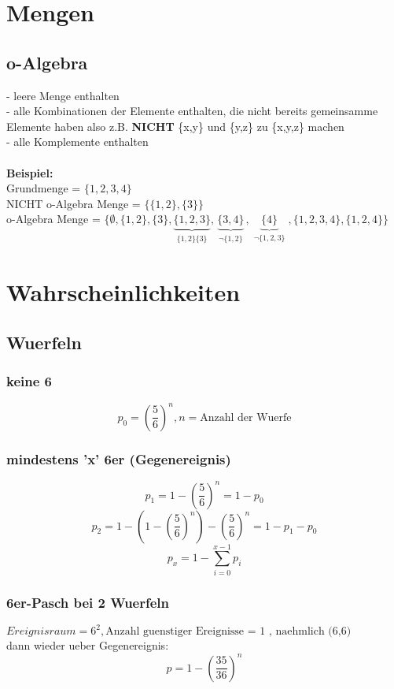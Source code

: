 \documentclass{article}
\begin{document}
\section{Mengen}
\subsection{o-Algebra}
- leere Menge enthalten\\
- alle Kombinationen der Elemente enthalten, die nicht bereits gemeinsamme Elemente haben also z.B. \textbf{NICHT} \{x,y\} und \{y,z\} zu \{x,y,z\} machen\\
- alle Komplemente enthalten\\ \\
\textbf{Beispiel:}\\
Grundmenge = $\{1,2,3,4\}$\\
NICHT o-Algebra Menge = $\{\{1,2\},\{3\}\}$\\
o-Algebra Menge = $\{\emptyset ,\{1,2\},\{3\},
	\underbrace{\{1,2,3\}}_{\substack{\{1,2\}\{3\}}},
	\underbrace{\{3,4\}}_{\substack{\neg \{1,2\}}},
	\underbrace{\{4\}}_{\substack{\neg \{1,2,3\}}},
\{1,2,3,4\},\{1,2,4\}\}$

\section{Wahrscheinlichkeiten}
\subsection{Wuerfeln}
\subsubsection{keine 6}
\[
	p_0 = \left( \frac{5}{6} \right)^n , n = \text{Anzahl der Wuerfe}
\]
\subsubsection{mindestens 'x' 6er (Gegenereignis)}
\[	
	p_1 = 1 - \left( \frac{5}{6} \right)^n = 1 - p_0
\]	
\[		
	p_2 = 1-\left(1 - \left( \frac{5}{6} \right)^n\right)-\left( \frac{5}{6} \right)^n = 1-p_1 -p_0
\]
\[
	p_x = 1 - \sum_{i=0}^{x-1} p_i
\]
\subsubsection{6er-Pasch bei 2 Wuerfeln}
$Ereignisraum = 6^2 , \text{Anzahl guenstiger Ereignisse = 1 , naehmlich (6,6)}$\\
dann wieder ueber Gegenereignis: \\
\[ p=1-\left(\frac{35}{36}\right)^n \]
\end{document}
